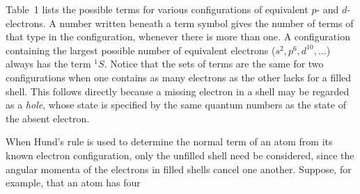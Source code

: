Table~1 lists the possible terms for various configurations of equivalent
$p$- and $d$-electrons. A number written beneath a term symbol gives the
number of terms of that type in the configuration, whenever there is more
than one. A configuration containing the largest possible number of
equivalent electrons ($s^2,p^6,d^{10},\ldots$) always has the term ${}^1S$.
Notice that the sets of terms are the same for two configurations when one
contains as many electrons as the other lacks for a filled shell. This follows
directly because a missing electron in a shell may be regarded as a
\emph{hole}, whose state is specified by the same quantum numbers as the state
of the absent electron.

When Hund's rule is used to determine the normal term of an atom from its
known electron configuration, only the unfilled shell need be considered,
since the angular momenta of the electrons in filled shells cancel one
another. Suppose, for example, that an atom has four
